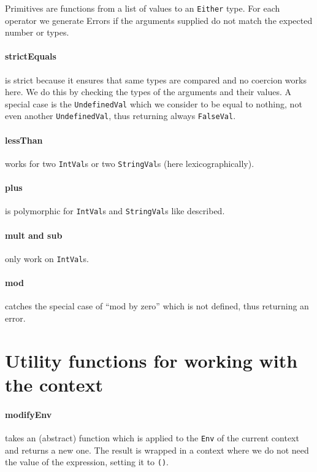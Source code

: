 \documentclass{article}
\begin{document}
Primitives are functions from a list of values to an \texttt{Either} type.
For each operator we generate Errors if the arguments supplied do not match the expected number or types.

\paragraph{strictEquals} is strict because it ensures that same types are compared and no coercion works here.
We do this by checking the types of the arguments and their values. A special case is the \texttt{UndefinedVal}
which we consider to be equal to nothing, not even another \texttt{UndefinedVal}, thus returning always \texttt{FalseVal}.

\paragraph{lessThan} works for two \texttt{IntVal}s or two \texttt{StringVal}s (here lexicographically).

\paragraph{plus} is polymorphic for \texttt{IntVal}s and \texttt{StringVal}s like described.

\paragraph{mult and sub} only work on \texttt{IntVal}s.

\paragraph{mod} catches the special case of ``mod by zero'' which is not defined, thus returning an error.


\section{Utility functions for working with the context}

\paragraph{modifyEnv} takes an (abstract) function which is applied to the \texttt{Env} of the current context and returns a new one.
The result is wrapped in a context where we do not need the value of the expression, setting it to \texttt{()}.
\end{document}
